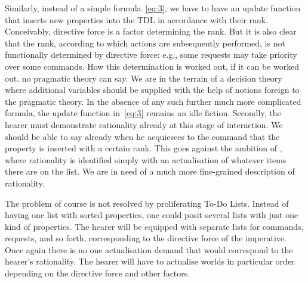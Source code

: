 Similarly, instead of a simple formula~\eqref{eq:3}, we have to have an update function that inserts new properties into the TDL in accordance with their rank. Conceivably, directive force is a factor determining the rank. But it is also clear that the rank, according to which actions are subsequently performed, is not functionally determined by directive force: e.g., some requests may take priority over some commands. How this determination is worked out, if it can be worked out, no pragmatic theory can say. We are in the terrain of a decision theory where additional variables should be supplied with the help of notions foreign to the pragmatic theory. In the absence of any such further much more complicated formula, the update function in~\eqref{eq:3} remains an idle fiction. Secondly, the hearer must demonstrate rationality already at this stage of interaction. We should be able to say already when he acquiesces to the command that the property is inserted with a certain rank. This goes against the ambition of \Th, where rationality is identified simply with an actualisation of whatever items there are on the list. We are in need of a much more fine-grained description of rationality.

The problem of course is not resolved by proliferating To-Do Lists. Instead of having one list with sorted properties, one could posit several lists with just one kind of properties. The hearer will be equipped with separate lists for commands, requests, and so forth, corresponding to the directive force of the imperative. Once again there is no one actualisation demand that would correspond to the hearer's rationality. The hearer will have to actualise worlds in particular order depending on the directive force and other factors. 


%
%


